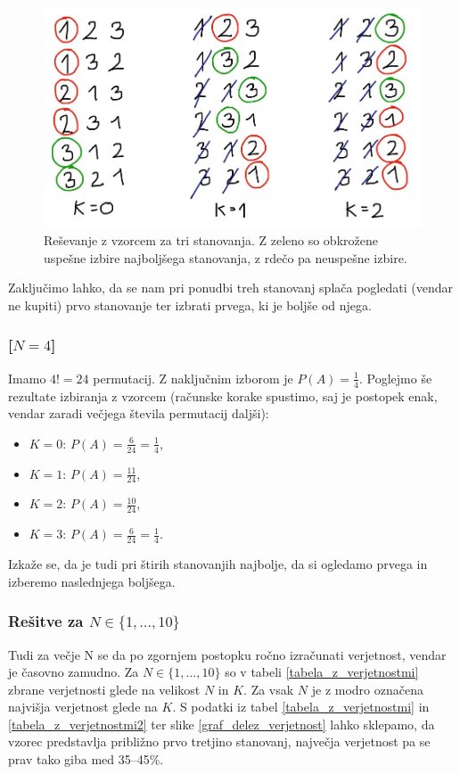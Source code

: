 \documentclass[a4paper, 12pt, titlepage]{article}
\begin{document}
\begin{figure}
    \centering
    \includegraphics[scale=1.3]{slike/resevanje_N_3.jpg}
    \caption{Reševanje z vzorcem za tri stanovanja. Z zeleno so obkrožene uspešne izbire najboljšega stanovanja, z rdečo pa neuspešne izbire.}
    \label{Nje3}
\end{figure}

Zaključimo lahko, da se nam pri ponudbi treh stanovanj splača pogledati (vendar ne kupiti) prvo stanovanje ter izbrati prvega, ki je boljše od njega.

\subsubsection*{[$N=4$]}
Imamo $4!=24$ permutacij. Z naključnim izborom je $P(A)=\frac{1}{4}$. Poglejmo še rezultate izbiranja z vzorcem (računske korake spustimo, saj je postopek enak, vendar zaradi večjega števila permutacij daljši):
\begin{itemize}
    \item $K=0$: $P(A)=\frac{6}{24}=\frac{1}{4}$,
    \item $K=1$: $P(A)=\frac{11}{24}$,
    \item $K=2$: $P(A)=\frac{10}{24}$,
    \item $K=3$: $P(A)=\frac{6}{24}=\frac{1}{4}$.
\end{itemize}
Izkaže se, da je tudi pri štirih stanovanjih najbolje, da si ogledamo prvega in izberemo naslednjega boljšega.

\subsubsection{Rešitve za $N \in \{1,\ldots,10\}$}

Tudi za večje N se da po zgornjem postopku ročno izračunati verjetnost, vendar je časovno zamudno. Za $N \in \{1,\ldots,10\}$ so v tabeli \ref{tabela_z_verjetnostmi} zbrane verjetnosti glede na velikost $N$ in $K$. Za vsak $N$ je z modro označena najvišja verjetnost glede na $K$. S podatki iz tabel \ref{tabela_z_verjetnostmi} in \ref{tabela_z_verjetnostmi2} ter slike \ref{graf_delez_verjetnost} lahko sklepamo, da vzorec predstavlja približno prvo tretjino stanovanj, največja verjetnost pa se prav tako giba med 35--45\%.
\end{document}

